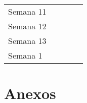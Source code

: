 \documentclass[12pt,oneside,a4paper,article]{abntex2}
\begin{document}
\begin{table}[]
\begin{tabular}{@{}lllll@{}}
Semana 11              &                                   &                               &                                      &                             \\
Semana 12              &                                   &                               &                                      &                             \\
Semana 13              &                                   &                               &                                      &                             \\
Semana 1               &                                   &                               &                                      &                            
\end{tabular}
\end{table}

\part*{Anexos}

\end{document}
